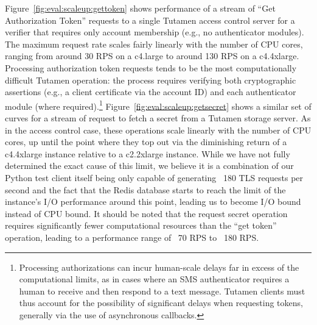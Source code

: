 Figure~\ref{fig:eval:scaleup:gettoken} shows performance of a stream
of ``Get Authorization Token'' requests to a single Tutamen access
control server for a verifier that requires only account membership
(e.g., no authenticator modules). The maximum request rate scales
fairly linearly with the number of CPU cores, ranging from around 30
RPS on a c4.large to around 130 RPS on a c4.4xlarge. Processing
authorization token requests tends to be the most computationally
difficult Tutamen operation: the process requires verifying both
cryptographic assertions (e.g., a client certificate via the account
ID) and each authenticator module (where
required).\footnote{Processing authorizations can incur human-scale
  delays far in excess of the computational limits, as in cases where
  an SMS authenticator requires a human to receive and then respond to
  a text message. Tutamen clients must thus account for the
  possibility of significant delays when requesting tokens, generally
  via the use of asynchronous callbacks.}
Figure~\ref{fig:eval:scaleup:getsecret} shows a similar set of curves
for a stream of request to fetch a secret from a Tutamen storage
server. As in the access control case, these operations scale linearly
with the number of CPU cores, up until the point where they top out
via the diminishing return of a c4.4xlarge instance relative to a
c2.2xlarge instance. While we have not fully determined the exact
cause of this limit, we believe it is a combination of our Python test
client itself being only capable of generating ~180 TLS requests per
second and the fact that the Redis database starts to reach the limit
of the instance's I/O performance around this point, leading us to
become I/O bound instead of CPU bound. It should be noted that the
request secret operation requires significantly fewer computational
resources than the ``get token'' operation, leading to a performance
range of ~70 RPS to ~180 RPS.

